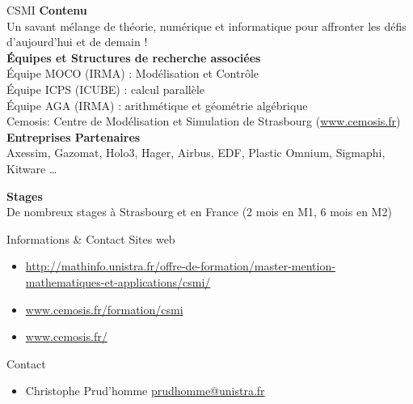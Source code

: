 \begin{frame}{CSMI}
  \textbf{Contenu}\\
  Un savant mélange de théorie, numérique et informatique pour
  affronter les défis d'aujourd'hui et de demain !\\

  \textbf{Équipes et Structures de recherche associées}\\
  Équipe MOCO (IRMA) : Modélisation et Contrôle\\
  Équipe ICPS (ICUBE) : calcul parallèle\\
  Équipe AGA (IRMA) : arithmétique et géométrie algébrique\\
  Cemosis: Centre de Modélisation et Simulation de Strasbourg (\url{www.cemosis.fr})\\

  \textbf{Entreprises Partenaires}\\
  Axessim, Gazomat, Holo3, Hager, Airbus, EDF, Plastic Omnium,
  Sigmaphi, Kitware \ldots

  \textbf{Stages}\\
  De nombreux stages à Strasbourg et en France (2 mois en M1, 6 mois
  en M2)

\end{frame}

\begin{frame}{Informations \& Contact}
  Sites web
  \begin{itemize}
  \item \url{http://mathinfo.unistra.fr/offre-de-formation/master-mention-mathematiques-et-applications/csmi/}
  \item \url{www.cemosis.fr/formation/csmi}
  \item \url{www.cemosis.fr/}
  \end{itemize}
  Contact
  \begin{itemize}
  \item Christophe Prud'homme \url{prudhomme@unistra.fr}
  \end{itemize}
\end{frame}
